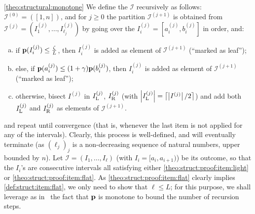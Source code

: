 \begin{proofof}{\cref{theo:structural:monotone}}
We define the $\mathcal{I}$ recursively as follows: $\mathcal{I}^{(0)}=([1,n])$, and for $j \geq 0$ the partition $\mathcal{I}^{(j+1)}$ is obtained from $\mathcal{I}^{(j)}=(I_1^{(j)},\dots,I_{\ell_j}^{(j)})$ by going over the $I^{(j)}_i=[a^{(j)}_i, b^{(j)}_i]$ in order, and:
\begin{enumerate}[(a)]
  \item\label{theo:struct:proof:item:light} if $\mathbf{p}(I^{(j)}_i)\leq \frac{\zeta}{L}$, then $I^{(j)}_i$ is added as element of $\mathcal{I}^{(j+1)}$ (``marked as leaf'');
  \item\label{theo:struct:proof:item:flat} else, if $\mathbf{p}(a^{(j)}_i) \leq (1+\gamma)\mathbf{p}(b^{(j)}_i)$, then $I^{(j)}_i$ is added as element of $\mathcal{I}^{(j+1)}$ (``marked as leaf'');
  \item otherwise, bisect $I^{(j)}$ in $I^{(j)}_{\rm L}$, $I^{(j)}_{\rm R}$ (with $\left\lvert I^{(j)}_{\rm L} \right\rvert=\left\lceil \left\lvert I^{(j)} \right\rvert/2 \right\rceil$) and add both $I^{(j)}_{\rm L}$ and $I^{(j)}_{\rm R}$ as elements of $\mathcal{I}^{(j+1)}$.
\end{enumerate}
and repeat until convergence (that is, whenever the last item is not applied for any of the intervals). Clearly, this process is well-defined, and will eventually terminate (as $(\ell_j)_j$ is a non-decreasing sequence of natural numbers, upper bounded by $n$). Let $\mathcal{I}=(I_1,\dots,I_{\ell})$ (with $I_i=[a_i,a_{i+1})$) be its outcome, so that the $I_i$'s are consecutive intervals all satisfying either \ref{theo:struct:proof:item:light} or \ref{theo:struct:proof:item:flat}. As \ref{theo:struct:proof:item:flat} clearly implies \ref{def:struct:item:flat}, we only need to show that $\ell \leq L$; for this purpose, we shall leverage as in~\cite{BKR:04} the fact that $\mathbf{p}$ is monotone to bound the number of recursion steps.


\end{proofof}
